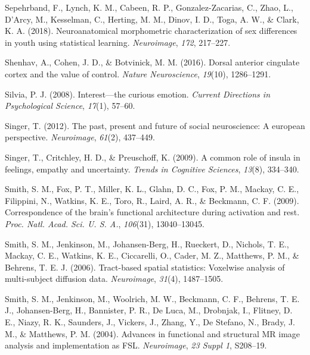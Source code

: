 \documentclass[11pt,american,a4paper,oneside,]{memoir} %
\begin{document}
\leavevmode\hypertarget{ref-Sepehrband2018-dy}{}%
Sepehrband, F., Lynch, K. M., Cabeen, R. P., Gonzalez-Zacarias, C., Zhao, L., D'Arcy, M., Kesselman, C., Herting, M. M., Dinov, I. D., Toga, A. W., \& Clark, K. A. (2018). Neuroanatomical morphometric characterization of sex differences in youth using statistical learning. \emph{Neuroimage}, \emph{172}, 217--227.

\leavevmode\hypertarget{ref-shenhav2016dorsal}{}%
Shenhav, A., Cohen, J. D., \& Botvinick, M. M. (2016). Dorsal anterior cingulate cortex and the value of control. \emph{Nature Neuroscience}, \emph{19}(10), 1286--1291.

\leavevmode\hypertarget{ref-silvia2008interest}{}%
Silvia, P. J. (2008). Interest---the curious emotion. \emph{Current Directions in Psychological Science}, \emph{17}(1), 57--60.

\leavevmode\hypertarget{ref-singer2012past}{}%
Singer, T. (2012). The past, present and future of social neuroscience: A european perspective. \emph{Neuroimage}, \emph{61}(2), 437--449.

\leavevmode\hypertarget{ref-singer2009common}{}%
Singer, T., Critchley, H. D., \& Preuschoff, K. (2009). A common role of insula in feelings, empathy and uncertainty. \emph{Trends in Cognitive Sciences}, \emph{13}(8), 334--340.

\leavevmode\hypertarget{ref-Smith2009-kj}{}%
Smith, S. M., Fox, P. T., Miller, K. L., Glahn, D. C., Fox, P. M., Mackay, C. E., Filippini, N., Watkins, K. E., Toro, R., Laird, A. R., \& Beckmann, C. F. (2009). Correspondence of the brain's functional architecture during activation and rest. \emph{Proc. Natl. Acad. Sci. U. S. A.}, \emph{106}(31), 13040--13045.

\leavevmode\hypertarget{ref-Smith2006-sf}{}%
Smith, S. M., Jenkinson, M., Johansen-Berg, H., Rueckert, D., Nichols, T. E., Mackay, C. E., Watkins, K. E., Ciccarelli, O., Cader, M. Z., Matthews, P. M., \& Behrens, T. E. J. (2006). Tract-based spatial statistics: Voxelwise analysis of multi-subject diffusion data. \emph{Neuroimage}, \emph{31}(4), 1487--1505.

\leavevmode\hypertarget{ref-Smith2004-sc}{}%
Smith, S. M., Jenkinson, M., Woolrich, M. W., Beckmann, C. F., Behrens, T. E. J., Johansen-Berg, H., Bannister, P. R., De Luca, M., Drobnjak, I., Flitney, D. E., Niazy, R. K., Saunders, J., Vickers, J., Zhang, Y., De Stefano, N., Brady, J. M., \& Matthews, P. M. (2004). Advances in functional and structural MR image analysis and implementation as FSL. \emph{Neuroimage}, \emph{23 Suppl 1}, S208--19.
\end{document}
